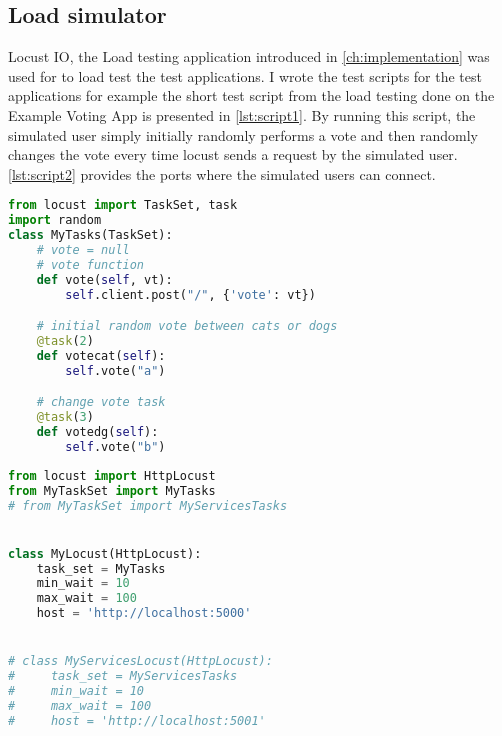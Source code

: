 \subsection{Load simulator}
Locust IO\cite{locustIO}, the Load testing application introduced in \autoref{ch:implementation} was used for to load test the test applications. I wrote the test scripts for the test applications for example the short test script from the load testing done on the Example Voting App is presented in \autoref{lst:script1}. By running this script, the simulated user simply initially randomly performs a vote and then randomly changes the vote every time locust sends a request by the simulated user. \autoref{lst:script2} provides the ports where the simulated users can connect.

\begin{lstlisting}[language=Python, caption=Example Voting App testing Script, label= lst:script1]
from locust import TaskSet, task
import random
class MyTasks(TaskSet):
    # vote = null
    # vote function
    def vote(self, vt):
        self.client.post("/", {'vote': vt})

    # initial random vote between cats or dogs
    @task(2)
    def votecat(self):
        self.vote("a")

    # change vote task
    @task(3)
    def votedg(self):
        self.vote("b")
\end{lstlisting}

\begin{lstlisting}[language=Python, caption=Locust open ports Script, label= lst:script2]
from locust import HttpLocust
from MyTaskSet import MyTasks
# from MyTaskSet import MyServicesTasks


class MyLocust(HttpLocust):
    task_set = MyTasks
    min_wait = 10
    max_wait = 100
    host = 'http://localhost:5000'


# class MyServicesLocust(HttpLocust):
#     task_set = MyServicesTasks
#     min_wait = 10
#     max_wait = 100
#     host = 'http://localhost:5001'


\end{lstlisting}

